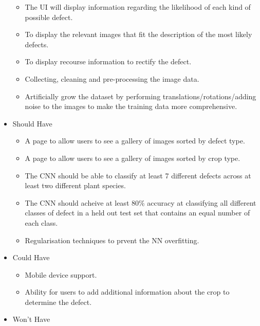\begin{itemize}
\begin{itemize}
  	\item The UI will display information regarding the likelihood of each kind of possible defect.
  	\item To display the relevant images that fit the description of the most likely defects.
  	\item To display recourse information to rectify the defect.
  	\item Collecting, cleaning and pre-processing the image data.
    \item Artificially grow the dataset by performing translations/rotations/adding noise to the images to make the training data more comprehensive.
  \end{itemize}
  \item Should Have
  \begin{itemize}
    \item A page to allow users to see a gallery of images sorted by
      defect type.
    \item A page to allow users to see a gallery of images sorted by
      crop type.
    \item The CNN should be able to classify at least 7 different defects across at least two different plant species.
    \item The CNN should acheive at least 80\% accuracy at classifying all different classes of defect in a held out test set that contains an equal number of each class.
  	\item Regularisation techniques to prvent the NN overfitting.
  \end{itemize}
  \item Could Have
    \begin{itemize}
      \item Mobile device support.
    \end{itemize}
  \begin{itemize}
    \item Ability for users to add additional information about the crop
      to determine the defect.
  \end{itemize}
  \item Won't Have
\end{itemize}


